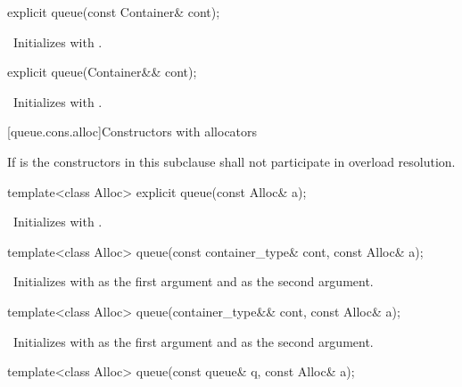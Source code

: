 \begin{itemdecl}
explicit queue(const Container& cont);
\end{itemdecl}

\begin{itemdescr}
\pnum
\effects\ Initializes  with .
\end{itemdescr}

\begin{itemdecl}
explicit queue(Container&& cont);
\end{itemdecl}

\begin{itemdescr}
\pnum
\effects\ Initializes  with .
\end{itemdescr}

[queue.cons.alloc]{Constructors with allocators}

\pnum
If  is 
the constructors in this subclause shall not participate in overload resolution.

\begin{itemdecl}
template<class Alloc> explicit queue(const Alloc& a);
\end{itemdecl}

\begin{itemdescr}
\pnum
\effects\ Initializes  with .
\end{itemdescr}

\begin{itemdecl}
template<class Alloc> queue(const container_type& cont, const Alloc& a);
\end{itemdecl}

\begin{itemdescr}
\pnum
\effects\ Initializes  with  as the first argument and 
as the second argument.
\end{itemdescr}

\begin{itemdecl}
template<class Alloc> queue(container_type&& cont, const Alloc& a);
\end{itemdecl}

\begin{itemdescr}
\pnum
\effects\ Initializes  with  as the first argument and 
as the second argument.
\end{itemdescr}

\begin{itemdecl}
template<class Alloc> queue(const queue& q, const Alloc& a);
\end{itemdecl}

